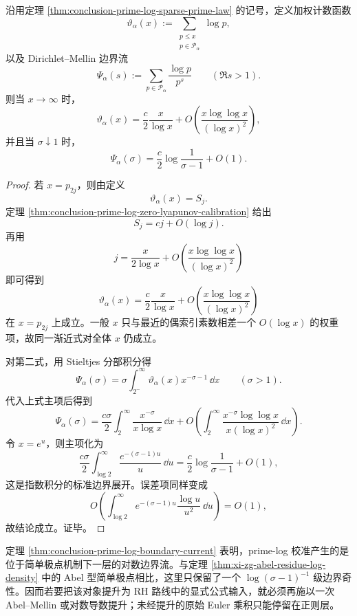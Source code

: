 \begin{theorem}\label{thm:conclusion-prime-log-boundary-current}
沿用定理 \ref{thm:conclusion-prime-log-sparse-prime-law} 的记号，定义加权计数函数
\[
\vartheta_\alpha(x):=\sum_{\substack{p\le x\\ p\in\mathcal P_\alpha}}\log p,
\]
以及 Dirichlet--Mellin 边界流
\[
\Psi_\alpha(s):=\sum_{p\in\mathcal P_\alpha}\frac{\log p}{p^s}
\qquad (\Re s>1).
\]
则当 \(x\to\infty\) 时，
\[
\vartheta_\alpha(x)=\frac{c}{2}\frac{x}{\log x}
+O\!\left(\frac{x\log\log x}{(\log x)^2}\right),
\]
并且当 \(\sigma\downarrow1\) 时，
\[
\Psi_\alpha(\sigma)=\frac{c}{2}\log\frac{1}{\sigma-1}+O(1).
\]
\end{theorem}
\begin{proof}
若 \(x=p_{2j}\)，则由定义
\[
\vartheta_\alpha(x)=S_j.
\]
定理 \ref{thm:conclusion-prime-log-zero-lyapunov-calibration} 给出
\[
S_j=cj+O(\log j).
\]
再用
\[
j=\frac{x}{2\log x}
+O\!\left(\frac{x\log\log x}{(\log x)^2}\right)
\]
即可得到
\[
\vartheta_\alpha(x)=\frac{c}{2}\frac{x}{\log x}
+O\!\left(\frac{x\log\log x}{(\log x)^2}\right)
\]
在 \(x=p_{2j}\) 上成立。一般 \(x\) 只与最近的偶索引素数相差一个 \(O(\log x)\) 的权重项，故同一渐近式对全体 \(x\) 仍成立。

对第二式，用 Stieltjes 分部积分得
\[
\Psi_\alpha(\sigma)
=
\sigma\int_{2^-}^{\infty}\vartheta_\alpha(x)x^{-\sigma-1}\,\dd x
\qquad (\sigma>1).
\]
代入上式主项后得到
\[
\Psi_\alpha(\sigma)
=
\frac{c\sigma}{2}\int_2^\infty \frac{x^{-\sigma}}{x\log x}\,\dd x
+
O\!\left(
\int_2^\infty \frac{x^{-\sigma}\log\log x}{x(\log x)^2}\,\dd x
\right).
\]
令 \(x=e^u\)，则主项化为
\[
\frac{c\sigma}{2}\int_{\log 2}^{\infty}\frac{e^{-(\sigma-1)u}}{u}\,\dd u
=
\frac{c}{2}\log\frac{1}{\sigma-1}+O(1),
\]
这是指数积分的标准边界展开。误差项同样变成
\[
O\!\left(\int_{\log 2}^{\infty}e^{-(\sigma-1)u}\frac{\log u}{u^2}\,\dd u\right)=O(1),
\]
故结论成立。证毕。
\end{proof}

\noindent
定理 \ref{thm:conclusion-prime-log-boundary-current} 表明，prime-log 校准产生的是位于简单极点机制下一层的对数边界流。与定理 \ref{thm:xi-zg-abel-residue-log-density} 中的 Abel 型简单极点相比，这里只保留了一个 \(\log(\sigma-1)^{-1}\) 级边界奇性。因而若要把该对象提升为 RH 路线中的显式公式输入，就必须再施以一次 Abel--Mellin 或对数导数提升；未经提升的原始 Euler 乘积只能停留在正则层。

